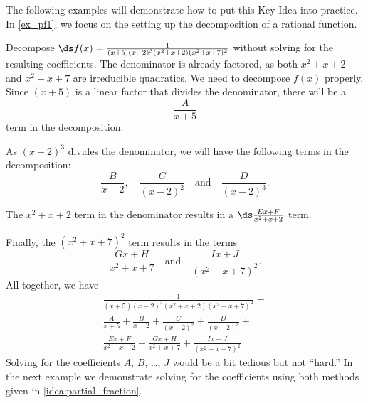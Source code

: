 
The following examples will demonstrate how to put this Key Idea into practice. In \autoref{ex_pf1}, we focus on the setting up the decomposition of a rational function.

\begin{example}\label{ex_pf1}
Decompose $\ds f(x)=\frac{1}{(x+5)(x-2)^3(x^2+x+2)(x^2+x+7)^2}$ without solving for the resulting coefficients.
\solution
The denominator is already factored, as both $x^2+x+2$ and $x^2+x+7$ are irreducible quadratics. We need to decompose $f(x)$ properly. Since $(x+5)$ is a linear factor that divides the denominator, there will be a
\[\frac{A}{x+5}\]
term in the decomposition.

As $(x-2)^3$ divides the denominator, we will have the following terms in the decomposition:
\[\frac{B}{x-2},\quad \frac{C}{(x-2)^2}\quad \text{and}\quad \frac{D}{(x-2)^3}.\]

The $x^2+x+2$ term in the denominator results in a $\ds\frac{Ex+F}{x^2+x+2}$ term.

Finally, the $(x^2+x+7)^2$ term results in the terms
\[\frac{Gx+H}{x^2+x+7}\quad \text{and}\quad \frac{Ix+J}{(x^2+x+7)^2}.\]
All together, we have
\begin{multline*}
	\frac{1}{(x+5)(x-2)^3(x^2+x+2)(x^2+x+7)^2}= \\
	\frac{A}{x+5} + \frac{B}{x-2}+ \frac{C}{(x-2)^2}+\frac{D}{(x-2)^3}+\\
	\frac{Ex+F}{x^2+x+2}+\frac{Gx+H}{x^2+x+7}+\frac{Ix+J}{(x^2+x+7)^2}
\end{multline*}
Solving for the coefficients $A$, $B$, \dots, $J$ would be a bit tedious but not ``hard.''  In the next example we demonstrate solving for the coefficients using both methods given in \autoref{idea:partial_fraction}.
\end{example}


